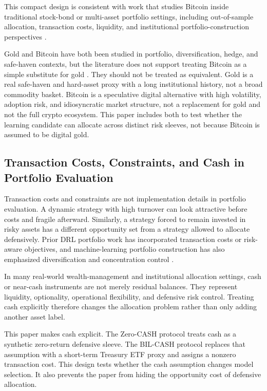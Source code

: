\documentclass[11pt]{article}
\newcommand{\cashzero}{Zero-CASH}
\newcommand{\cashbil}{BIL-CASH}
\begin{document}
This compact design is consistent with work that studies Bitcoin inside traditional stock-bond or multi-asset portfolio settings, including out-of-sample allocation, transaction costs, liquidity, and institutional portfolio-construction perspectives \citep{platanakis2020bitcoin,hubrich2023bitcoin,petukhina2021digitalassets}.

Gold and Bitcoin have both been studied in portfolio, diversification, hedge, and safe-haven contexts, but the literature does not support treating Bitcoin as a simple substitute for gold \citep{bouri2017bitcoinhedge,henriques2018bitcoinGold,guesmi2019bitcoinDiversification,klein2018bitcoin}. They should not be treated as equivalent. Gold is a real safe-haven and hard-asset proxy with a long institutional history, not a broad commodity basket. Bitcoin is a speculative digital alternative with high volatility, adoption risk, and idiosyncratic market structure, not a replacement for gold and not the full crypto ecosystem. This paper includes both to test whether the learning candidate can allocate across distinct risk sleeves, not because Bitcoin is assumed to be digital gold.

\subsection{Transaction Costs, Constraints, and Cash in Portfolio Evaluation}

Transaction costs and constraints are not implementation details in portfolio evaluation. A dynamic strategy with high turnover can look attractive before costs and fragile afterward. Similarly, a strategy forced to remain invested in risky assets has a different opportunity set from a strategy allowed to allocate defensively. Prior DRL portfolio work has incorporated transaction costs or risk-aware objectives, and machine-learning portfolio construction has also emphasized diversification and concentration control \citep{moody2001,almahdi2017,chen2022,jiang2024td3}.

In many real-world wealth-management and institutional allocation settings, cash or near-cash instruments are not merely residual balances. They represent liquidity, optionality, operational flexibility, and defensive risk control. Treating cash explicitly therefore changes the allocation problem rather than only adding another asset label.

This paper makes cash explicit. The \cashzero{} protocol treats cash as a synthetic zero-return defensive sleeve. The \cashbil{} protocol replaces that assumption with a short-term Treasury ETF proxy and assigns a nonzero transaction cost. This design tests whether the cash assumption changes model selection. It also prevents the paper from hiding the opportunity cost of defensive allocation.
\end{document}
